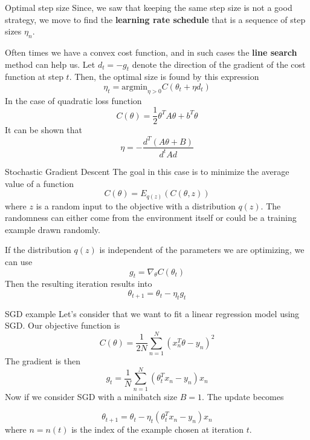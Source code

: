 \documentclass{beamer}
\begin{document}
\begin{frame}{Optimal step size}
	Since, we saw that keeping the same step size is not a good strategy, we move to find the \textbf{learning rate schedule} that is a sequence of step sizes $\eta_n$.
	
	Often times we have a convex cost function, and in such cases the \textbf{line search} method can help us. 
	Let $d_t=-g_t$ denote the direction of the gradient of the cost function at step $t$. Then, the optimal size is found by this expression
	\begin{equation*}
		\eta_t= \text{argmin}_{\eta >0} C(\theta_t +\eta d_t)
	\end{equation*}
	In the case of quadratic loss function
	\begin{equation*}
		C(\theta)= \frac{1}{2} \theta^T A \theta + b^T \theta
	\end{equation*}
	It can be shown that 
	\begin{equation*}
		\eta= - \frac{d^T(A\theta +B)}{d^t A d}
	\end{equation*}
	
	
\end{frame}

\begin{frame}{Stochastic Gradient Descent}
	The goal in this case is to minimize the average value of a function
	\begin{equation*}
		C(\theta)= E_{q(z)}(C(\theta,z))
	\end{equation*}
	where $z$ is a random input to the objective with a distribution $q(z)$. The randomness can either come from the environment itself or could be a training example drawn randomly. 
	
	If the distribution $q(z)$ is independent of the parameters we are optimizing, we can use 
	\begin{equation*}
		g_t= \nabla_{\theta} C(\theta_t)
	\end{equation*}
	Then the resulting iteration results into
	\begin{equation*}
		\theta_{t+1}=\theta_t - \eta_t g_t
	\end{equation*}
	
\end{frame}

\begin{frame}{SGD example}
	Let's consider that we want to fit a linear regression model using SGD. 
	Our objective function is
	\begin{equation*}
		C(\theta)= \frac{1}{2N} \sum_{n=1}^{N}(x_n^T \theta -y_n)^2
	\end{equation*}
	The gradient is then
	\begin{equation*}
		g_t = \frac{1}{N} \sum_{n=1}^{N} (\theta_t^T x_n - y_n )x_n
	\end{equation*}
	Now if we consider SGD with a minibatch size $B=1$. The update becomes
	
	\begin{equation*}
		\theta_{t+1}= \theta_t - \eta_t(\theta_t^T x_n -y_n)x_n
	\end{equation*}
	where $n=n(t)$ is the index of the example chosen at iteration $t$. 
\end{frame}
\end{document}
